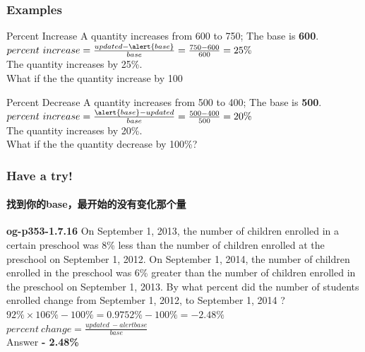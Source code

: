 \documentclass[
	11pt, %
	handout,
]{beamer}
\begin{document}
\begin{frame}
	\frametitle{Examples}
	

	
	\begin{exampleblock}{Percent Increase}
		A quantity increases from 600 to 750; The base is \pause \textbf{\alert{600}}.\\
		$percent\ increase = \frac{updated- \alert{base}}{base}  = \frac{750 - 600}{600} = 25\% $\\
		The quantity increases by 25\%. \\ \pause What if the the quantity increase by 100%
	\end{exampleblock}

	\bigskip %

		\begin{exampleblock}{Percent Decrease}
		A quantity increases from 500 to 400; The base is \pause \textbf{\alert{500}}.\\
		$percent\ increase = \frac{\alert{base} - updated}{base}  = \frac{500 - 400}{500} = 20\% $\\
		The quantity increases by 20\%. \\ \pause What if the the quantity decrease by 100\%?
	\end{exampleblock}
\end{frame}


\begin{frame}
	\frametitle{Have a try!}
	\framesubtitle{找到你的base，最开始的没有变化那个量}
	\textbf{og-p353-1.7.16}
On September 1, 2013, the number of children enrolled in
a certain preschool was 8\% less than the number of children enrolled at the
preschool on September 1, 2012. On September 1, 2014, the number of
children enrolled in the preschool was 6\% greater than the number of
children enrolled in the preschool on September 1, 2013. By what percent
did the number of students enrolled change from September 1, 2012, to
September 1, 2014 ? \\
\bigskip
\pause
$92\% \times 106\% - 100\% = 0.9752\% - 100\% = - 2.48\% $\\
$percent\ change = \frac{updated\ - alert{base} }{base} $\\
\bigskip
Answer \textbf{- 2.48\%}
\end{frame}

\end{document}
